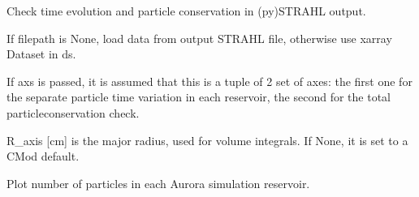 \documentclass[letterpaper,10pt,english]{sphinxmanual}
\begin{document}

\begin{fulllineitems}
\label{\detokenize{aurora:aurora.particle_conserv.plot_1d}}
Check time evolution and particle conservation in (py)STRAHL output.

If filepath is None, load data from output STRAHL file, otherwise use xarray Dataset in ds.

If axs is passed, it is assumed that this is a tuple of 2 set of axes: the first one for the separate 
particle time variation in each reservoir, the second for the total particle\sphinxhyphen{}conservation check.

R\_axis {[}cm{]} is the major radius, used for volume integrals. If None, it is set to a C\sphinxhyphen{}Mod default.

\end{fulllineitems}


\begin{fulllineitems}
\label{\detokenize{aurora:aurora.particle_conserv.plot_particle_conserv}}
Plot number of particles in each Aurora simulation reservoir.

\end{fulllineitems}

\end{document}
